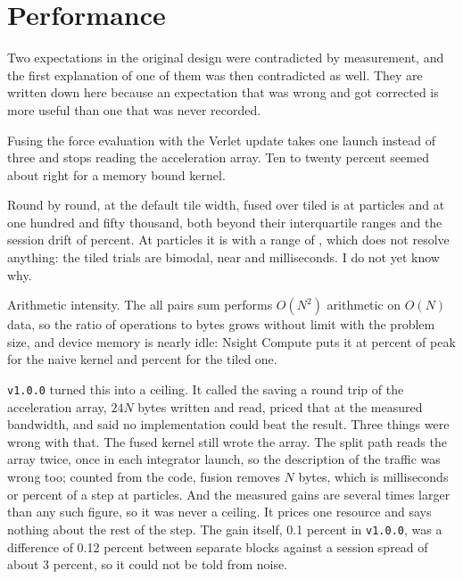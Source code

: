 \chapter{Performance}

Two expectations in the original design were contradicted by measurement, and the first
explanation of one of them was then contradicted as well. They are written down here
because an expectation that was wrong and got corrected is more useful than one that was
never recorded.


 Fusing the force evaluation with the Verlet update takes one launch
instead of three and stops reading the acceleration array. Ten to twenty percent seemed
about right for a memory bound kernel.

 Round by round, at the default tile width, fused over tiled is
\FusedOverTiledRatioAtTenThousand{} at \LadderMinN{} particles and
\FusedOverTiledRatioAtHundredFiftyThousand{} at one hundred and fifty thousand, both beyond
their interquartile ranges and the session drift of \RepeatabilitySpread{} percent. At
\LadderMaxN{} particles it is \FusedOverTiledRatioAtMaxN{} with a range of
\FusedOverTiledRatioIqrAtMaxN{}, which does not resolve anything: the tiled trials are
bimodal, near \TiledLowModeMsAtMaxN{} and \TiledHighModeMsAtMaxN{} milliseconds. I do not
yet know why.

 Arithmetic intensity. The all pairs sum performs
$O(N^2)$ arithmetic on $O(N)$ data, so the ratio of operations to bytes grows without limit
with the problem size, and device memory is nearly idle: Nsight Compute puts it at
\NaiveDramPct{} percent of peak for the naive kernel and \TiledDramPct{} percent for the
tiled one.

 \texttt{v1.0.0} turned this into a ceiling. It called the saving
a round trip of the acceleration array, $24N$ bytes written and read, priced that at the
measured bandwidth, and said no implementation could beat the result. Three things were wrong
with that. The fused kernel still wrote the array. The split path reads the array twice,
once in each integrator launch, so the description of the traffic was wrong too; counted from
the code, fusion removes \ModelBytesPerParticleSaved{}$N$ bytes, which is
\ModelSavingMsAtMaxN{} milliseconds or \ModelSavingPercentAtMaxN{} percent of a step at
\LadderMaxN{} particles. And the measured gains are several times larger than any such
figure, so it was never a ceiling. It prices one resource and says nothing about the rest of
the step. The gain itself, 0.1 percent in \texttt{v1.0.0}, was a difference of 0.12 percent
between separate blocks against a session spread of about 3 percent, so it could not be told
from noise.

